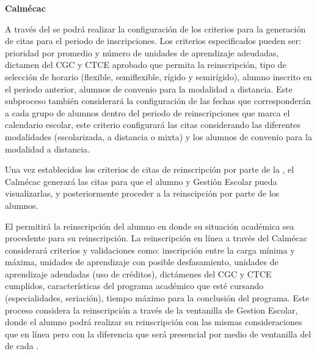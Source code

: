 \begin{PDescripcion}
\begin{enumerate}
		
	\end{enumerate}
	\Ppaso \textbf{Calmécac}
	\begin{enumerate}
		\Ppaso[\PSubProceso]  A través del  se podrá realizar la configuración de los criterios para la generación de citas para el periodo de inscripciones. Los criterios especificados pueden ser: prioridad por promedio y número de unidades de aprendizaje adeudadas, dictamen del CGC y CTCE aprobado que permita la reinscripción, tipo de selección de horario (flexible, semiflexible, rígido y semirígido), alumno inscrito en el periodo anterior, alumnos de convenio para la modalidad a distancia. Este subproceso también considerará la configuración de las fechas que corresponderán a cada grupo de alumnos dentro del periodo de reinscripciones que marca el calendario escolar, este criterio configurará las citas considerando las diferentes modalidades (escolarizada, a distancia o mixta) y los alumnos de convenio para la modalidad a distancia. %
		
		\Ppaso[\PSubProceso]  Una vez establecidos los criterios de citas de reinscripción por parte de la , el Calmécac generará las citas para que el alumno y Gestión Escolar pueda visualizarlas, y posteriormente proceder a la reinscipción por parte de los alumnos.
		
		\Ppaso[\PSubProceso]  El  permitirá la reinscripción del alumno en donde su situación académica sea procedente para su reinscripción. La reinscripción en línea a través del Calmécac considerará  criterios y validaciones como: inscripción entre la carga mínima y máxima, unidades de aprendizaje con posible desfasamiento, unidades de aprendizaje adeudadas (uso de créditos), dictámenes del CGC y CTCE cumplidos, características del programa académico que esté cursando (especialidades, seriación), tiempo máximo para la conclusión del programa.		
		\Ppaso[\PSubProceso]  Este proceso considera la reinscripción a través de la ventanilla de Gestion Escolar, donde el alumno podrá realizar su reinscripción con las mismas consideraciones que en línea pero con la diferencia que será presencial por medio de ventanilla del  de cada .
		

\end{enumerate}
\end{PDescripcion}
